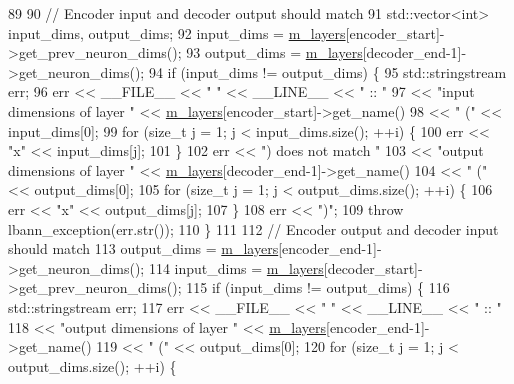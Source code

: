 \begin{DoxyCode}
89 
90     \textcolor{comment}{// Encoder input and decoder output should match}
91     std::vector<int> input\_dims, output\_dims;
92     input\_dims = \hyperlink{classlbann_1_1model_a0229fc226ec163d1411548446104569d}{m\_layers}[encoder\_start]->get\_prev\_neuron\_dims();
93     output\_dims = \hyperlink{classlbann_1_1model_a0229fc226ec163d1411548446104569d}{m\_layers}[decoder\_end-1]->get\_neuron\_dims();
94     \textcolor{keywordflow}{if} (input\_dims != output\_dims) \{
95       std::stringstream err;
96       err << \_\_FILE\_\_ << \textcolor{stringliteral}{" "} << \_\_LINE\_\_ << \textcolor{stringliteral}{" :: "}
97           << \textcolor{stringliteral}{"input dimensions of layer "} << \hyperlink{classlbann_1_1model_a0229fc226ec163d1411548446104569d}{m\_layers}[encoder\_start]->get\_name()
98           << \textcolor{stringliteral}{" ("} << input\_dims[0];
99       \textcolor{keywordflow}{for} (\textcolor{keywordtype}{size\_t} j = 1; j < input\_dims.size(); ++i) \{
100         err << \textcolor{stringliteral}{"x"} << input\_dims[j];
101       \}
102       err << \textcolor{stringliteral}{") does not match "}
103           << \textcolor{stringliteral}{"output dimensions of layer "} << \hyperlink{classlbann_1_1model_a0229fc226ec163d1411548446104569d}{m\_layers}[decoder\_end-1]->get\_name()
104           << \textcolor{stringliteral}{" ("} << output\_dims[0];
105       \textcolor{keywordflow}{for} (\textcolor{keywordtype}{size\_t} j = 1; j < output\_dims.size(); ++i) \{
106         err << \textcolor{stringliteral}{"x"} << output\_dims[j];
107       \}
108       err << \textcolor{stringliteral}{")"};
109       \textcolor{keywordflow}{throw} lbann\_exception(err.str());
110     \}
111 
112     \textcolor{comment}{// Encoder output and decoder input should match}
113     output\_dims = \hyperlink{classlbann_1_1model_a0229fc226ec163d1411548446104569d}{m\_layers}[encoder\_end-1]->get\_neuron\_dims();
114     input\_dims = \hyperlink{classlbann_1_1model_a0229fc226ec163d1411548446104569d}{m\_layers}[decoder\_start]->get\_prev\_neuron\_dims();
115     \textcolor{keywordflow}{if} (input\_dims != output\_dims) \{
116       std::stringstream err;
117       err << \_\_FILE\_\_ << \textcolor{stringliteral}{" "} << \_\_LINE\_\_ << \textcolor{stringliteral}{" :: "}
118           << \textcolor{stringliteral}{"output dimensions of layer "} << \hyperlink{classlbann_1_1model_a0229fc226ec163d1411548446104569d}{m\_layers}[encoder\_end-1]->get\_name()
119           << \textcolor{stringliteral}{" ("} << output\_dims[0];
120       \textcolor{keywordflow}{for} (\textcolor{keywordtype}{size\_t} j = 1; j < output\_dims.size(); ++i) \{

\end{DoxyCode}
